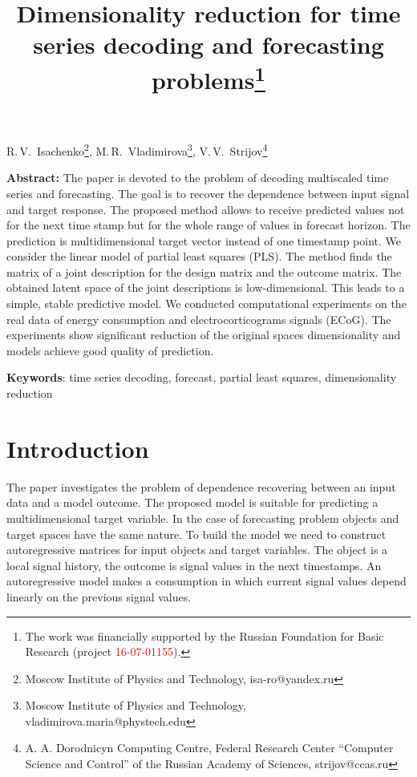 \documentclass[12pt,twoside]{article}
\begin{document}
	\title
	{Dimensionality reduction for time series decoding and forecasting problems\thanks{The work was financially supported by the Russian Foundation for Basic Research (project \textcolor{red}{16-07-01155}).}}
	\date{}
	\maketitle
	\begin{center}
		R.\,V.~Isachenko\footnote{Moscow Institute of Physics and Technology, isa-ro@yandex.ru},
		M.\,R.~Vladimirova\footnote{Moscow Institute of Physics and Technology, vladimirova.maria@phystech.edu},
		V.\,V.~Strijov\footnote{A. A. Dorodnicyn Computing Centre, Federal Research Center “Computer Science and Control” of the Russian Academy of Sciences, strijov@ccas.ru}
	\end{center}
	\textbf{Abstract:} 
	The paper is devoted to the problem of decoding multiscaled time series and forecasting.
	The goal is to recover the dependence between input signal and target response.
	The proposed method allows to receive predicted values not for the next time stamp but for the whole range of values in forecast horizon.
	The prediction is multidimensional target vector instead of one timestamp point. 
	We consider the linear model of partial least squares (PLS).
	The method finds the matrix of a joint description for the design matrix and the outcome matrix.
	The obtained latent space of the joint descriptions is low-dimensional.
	This leads to a simple, stable predictive model.
	We conducted computational experiments on the real data of energy consumption and electrocorticograms signals (ECoG). 
	The experiments show significant reduction of the original spaces dimensionality and models achieve good quality of prediction.
	
	\bigskip
	\textbf{Keywords}: time series decoding, forecast, partial least squares, dimensionality reduction

\linenumbers
\section{Introduction}

The paper investigates the problem of dependence recovering between an input data and a model outcome.
The proposed model is suitable for predicting a multidimensional target variable.
In the case of forecasting problem objects and target spaces have the same nature.
To build the model we need to construct autoregressive matrices for input objects and target variables.
The object is a local signal history, the outcome is signal values in the next timestamps.
An autoregressive model makes a consumption in which current signal values depend linearly on the previous signal values.
\end{document}
